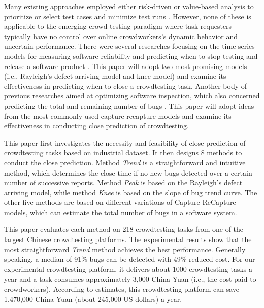 \documentclass[sigconf,review, anonymous]{acmart}
\newcommand{\task}{218}
\begin{document}
Many existing approaches employed either risk-driven or value-based analysis to prioritize or select test cases and minimize test runs \cite{wang2017qtep,shi2015comparing,harman2015empirical,saha2015information,henard2016comparing}. 
However, none of these is applicable to the emerging crowd testing paradigm where task requesters typically have no control over online crowdworkers's dynamic behavior and uncertain performance.
There were several researches focusing on the time-series models for measuring software reliability and predicting when to stop testing and release a software product \cite{garg2011stop,garg2013method,iqbal2013software}.
This paper will adopt two most promising models (i.e., Rayleigh's defect arriving model and knee model) and examine its effectiveness in predicting when to close a crowdtesting task.
Another body of previous researches aimed at optimizing software inspection, which also concerned predicting the total and remaining number of bugs  \cite{briand2000comprehensive,walia2009evaluating,chun2006estimating,rong2017towards,mandala2012application,goswami2015using,vitharana2017defect}. 
This paper will adopt ideas from the most commonly-used capture-recapture models and examine its effectiveness in conducting close prediction of crowdtesting. 


This paper first investigates the necessity and feasibility of close prediction of crowdtesting tasks based on industrial dataset.
It then designs 8 methods to conduct the close prediction.
Method \textit{Trend} is a straightforward and intuitive method, which determines the close time if no new bugs detected over a certain number of successive reports. 
Method \textit{Peak} is based on the Rayleigh's defect arriving model, while method \textit{Knee} is based on the slope of bug trend curve.
The other five methods are based on different variations of Capture-ReCapture models, which can estimate the total number of bugs in a software system.

This paper evaluates each method on {\task} crowdtesting tasks from one of the largest Chinese crowdtesting platforms.
The experimental results show that the most straightforward \textit{Trend} method achieves the best performance.
Generally speaking, a median of 91\% bugs can be detected with 49\% reduced cost.
For our experimental crowdtesting platform, it delivers about 1000 crowdtesting tasks a year and a task consumes approximately 3,000 China Yuan (i.e., the cost paid to crowdworkers).
According to estimates, this crowdtesting platform can save 1,470,000 China Yuan (about 245,000 US dollars) a year.
\end{document}
